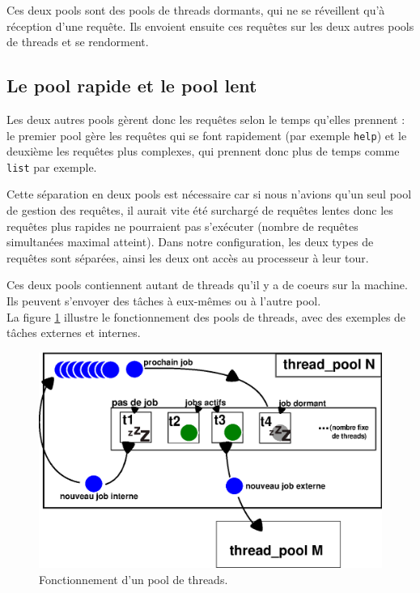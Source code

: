 Ces deux pools sont des pools de threads dormants, qui ne se réveillent qu'à 
réception d'une requête. Ils envoient ensuite ces requêtes sur les deux autres
pools de threads et se rendorment.

\subsection{Le pool rapide et le pool lent}
Les deux autres pools gèrent donc les requêtes selon le temps qu'elles 
prennent : le premier pool gère les requêtes qui se font rapidement 
(par exemple \verb$help$) et le deuxième les requêtes plus complexes, qui 
prennent donc plus de temps comme \verb$list$ par exemple.

Cette séparation en deux pools est nécessaire car si nous n'avions qu'un seul 
pool de gestion des requêtes, il aurait vite été surchargé de requêtes lentes
donc les requêtes plus rapides ne pourraient pas s'exécuter (nombre de requêtes
simultanées maximal atteint). Dans notre configuration, les deux types de 
requêtes sont séparées, ainsi les deux ont accès au processeur à leur tour.

Ces deux pools contiennent autant de threads qu'il y a de coeurs sur la
machine. Ils peuvent s'envoyer des tâches à eux-mêmes ou à l'autre pool.\\

La figure \ref{fonctionnement} illustre le fonctionnement des pools de threads,
 avec des exemples de tâches externes et internes.

\begin{center}
\begin{figure}[htbp]
    \centering
    \includegraphics[scale=0.5]{thread_pool.eps}
    \caption{Fonctionnement d'un pool de threads.}
    \label{fonctionnement}
\end{figure}
\end{center}


